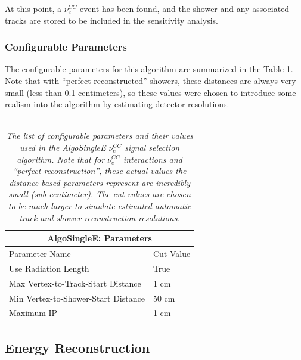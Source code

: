 At this point, a $\nu_e^{CC}$ event has been found, and the shower and any associated tracks are stored to be included in the sensitivity analysis.

\subsubsection{Configurable Parameters}
The configurable parameters for this algorithm are summarized in the Table \ref{algosinglee_table}. Note that with ``perfect reconstructed'' showers, these distances are always very small (less than 0.1 centimeters), so these values were chosen to introduce some realism into the algorithm by estimating detector resolutions.\\\\

\begin{table}
\begin{tabular}{ |p{8 cm}|p{1.5 cm}|  }
 \hline
 \multicolumn{2}{|c|}{AlgoSingleE: Parameters} \\
 \hline
 Parameter Name &  Cut Value \\
 \hline \hline
 Use Radiation Length &  True\\\hline
 
 Max Vertex-to-Track-Start Distance & 1 cm \\\hline

 Min Vertex-to-Shower-Start Distance & 50 cm \\\hline

 Maximum IP & 1 cm \\\hline

 \hline
\end{tabular}
\caption{\textit{The list of configurable parameters and their values used in the AlgoSingleE $\nu_e^{CC}$ signal selection algorithm. Note that for $\nu_e^{CC}$ interactions and ``perfect reconstruction'', these actual values the distance-based parameters represent are incredibly small (sub centimeter). The cut values are chosen to be much larger to simulate estimated automatic track and shower reconstruction resolutions.}}\label{algosinglee_table}
\end{table}










\subsection{Energy Reconstruction}\label{LEE_EnergyReco_section}

